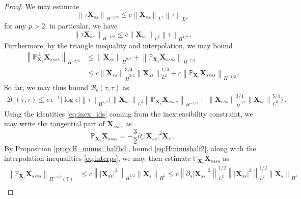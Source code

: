 \documentclass[11pt,reqno]{amsart}
\newcommand{\T}{\mathbb{T}}
\renewcommand{\P}{\mathbb{P}}
\newcommand{\X}{\bm{X}}
\newcommand{\p}{\partial}
\newcommand{\abs}[1]{\left\lvert #1 \right\rvert}
\newcommand{\norm}[1]{\left\lVert #1 \right\rVert}
\newcommand{\mc}[1]{\mathcal{#1}}
\numberwithin{equation}{section}
\theoremstyle{definition}
\begin{document}
\begin{proof}
We may estimate
\begin{equation}\label{eq:Lp_bd}
  \norm{\tau\X_{ss}}_{H^{-1/8}} \le c\norm{\X_{ss}}_{L^2}\norm{\tau}_{L^p}
\end{equation}
for any $p>2$; in particular, we have
\begin{equation}\label{eq:Hminusm}
  \norm{\tau\X_{ss}}_{H^{-1/8}} \le c\norm{\X_{ss}}_{L^2}\norm{\tau}_{H^{1/2}}\,.
\end{equation}
%
%
Furthermore, by the triangle inequality and interpolation, we may bound 
\begin{equation}
\begin{aligned}
  \norm{\P_{\X_s}^\perp\X_{ssss}}_{H^{-7/8}} &\le \norm{\X_{ss}}_{\dot H^{9/8}} + \norm{\P_{\X_s}\X_{ssss}}_{H^{-7/8}} \\
  &\le c\norm{\X_{ss}}_{\dot H^{3/2}}^{3/4}\norm{\X_{ss}}_{L^2}^{1/4} + c\norm{\P_{\X_s}\X_{ssss}}_{H^{-1/2}}\,.
\end{aligned}
\end{equation}
%
So far, we may thus bound $\mc{B}_\epsilon(\tau,\tau)$ as
\begin{equation}
\begin{aligned}
  \mc{B}_\epsilon(\tau,\tau)\le c\,\epsilon^{-1}\abs{\log\epsilon} \norm{\tau}_{H^{1/2}}\bigg(\norm{\X_{ss}}_{L^2}\norm{\P_{\X_s}\X_{ssss}}_{H^{-1/2}} +\norm{\X_{sss}}_{\dot H^{1/2}}^{3/4}\norm{\X_{ss}}_{L^2}^{5/4} \bigg)\,.
\end{aligned}
\end{equation}
%
%
Using the identities \eqref{eq:inex_ids} coming from the inextensibility constraint, we may write the tangential part of $\X_{ssss}$ as
\begin{equation}
  \P_{\X_s}\X_{ssss} = -\frac{3}{2}\p_s\abs{\X_{ss}}^2\X_s\,.
\end{equation}
By Proposition \ref{prop:H_minus_halfbd}, bound \eqref{eq:Hminushalf2}, along with the interpolation inequalities \eqref{eq:interps}, we may then estimate $\P_{\X_s}\X_{ssss}$ as 
\begin{equation}
\begin{aligned}
  \norm{\P_{\X_s}\X_{ssss}}_{H^{-1/2}(\T)} &\le c\norm{\abs{\X_{ss}}^2}_{\dot H^{1/2}}\norm{\X_s}_{H^1}
  \le c\norm{\p_s\abs{\X_{ss}}^2}_{L^2}^{1/2}\norm{\abs{\X_{ss}}^2}_{L^2}^{1/2}\norm{\X_s}_{H^1}\\

\end{aligned}
\end{equation}
\end{proof}
\end{document}
